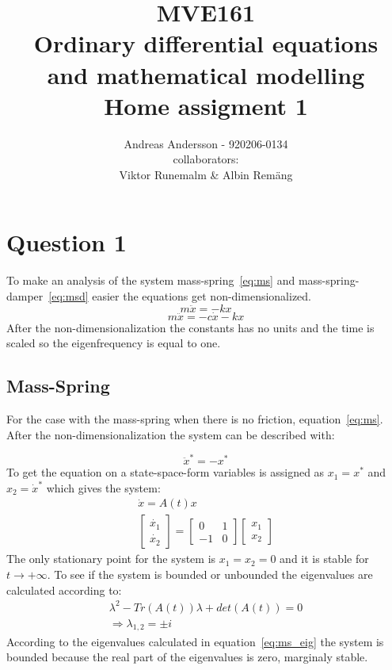 \documentclass[
  twoside,
  11pt, a4paper,
  footinclude=true,
  headinclude=true,
  cleardoublepage=empty
]{scrbook}
\title{\Large MVE161\\ \small Ordinary differential equations\\ and mathematical modelling\\ \Huge Home assigment 1}
\author{Andreas Andersson - 920206-0134\\ collaborators: \\Viktor Runemalm \& Albin Remäng}
\begin{document}
\maketitle

\chapter{Question 1}
To make an analysis of the system mass-spring~\eqref{eq:ms} and mass-spring-damper~\eqref{eq:msd} easier the equations get non-dimensionalized.
\begin{equation}\label{eq:ms}
	m \ddot{x} = -k x
\end{equation}
\begin{equation}\label{eq:msd}
	m \ddot{x} = -c \dot{x} -k x
\end{equation}
After the non-dimensionalization the constants has no units and the time is scaled so the eigenfrequency is equal to one. 

\section{Mass-Spring}\label{sec:ms}
For the case with the mass-spring when there is no friction, equation~\eqref{eq:ms}. After the non-dimensionalization the system can be described with:

\begin{equation}
	\ddot{x}^*=-x^*
\end{equation}
To get the equation on a state-space-form variables is assigned as $x_1=x^*$ and $x_2=\dot{x}^*$ which gives the system:
\begin{equation}
	\begin{gathered}
		\dot{x}=A(t)x\\
		\begin{bmatrix}
			\dot{x_1}\\
			\dot{x_2}
		\end{bmatrix}=\begin{bmatrix}
			0	&	1\\
			-1	&	0
		\end{bmatrix}\begin{bmatrix}
			x_1\\
			x_2
		\end{bmatrix}
	\end{gathered}
\end{equation}
The only stationary point for the system is $x_1=x_2=0$ and it is stable for $t\rightarrow+\infty$. To see if the system is bounded or unbounded the eigenvalues are calculated according to:
\begin{equation}\label{eq:ms_eig}
	\begin{gathered}
		\lambda^2-Tr(A(t))\lambda+det(A(t))=0\\
		\Rightarrow \lambda_{1,2}=\pm i
	\end{gathered}
\end{equation}
According to the eigenvalues calculated in equation~\eqref{eq:ms_eig} the system is bounded because the real part of the eigenvalues is zero, marginaly stable.
\end{document}
